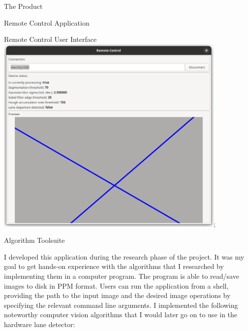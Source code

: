 \documentclass{matthijs}
\begin{document}
\begin{hoofdstuk}{The Product}
\begin{paragraaf}{Remote Control Application}
			\vspace{1.5ex}
			\begin{figuur}{Remote Control User Interface}
				\includegraphics[width=0.845\textwidth]{product-gui.png};
			\end{figuur}
			\vspace{-1ex}

		\end{paragraaf}

		\begin{paragraaf}{Algorithm Toolsuite}

			I developed this application during the research phase of the project.
			It was my goal to get hands-on experience with the algorithms that I researched by implementing them in a computer program.
			The program is able to read/save images to disk in PPM format.
			Users can run the application from a shell, providing the path to the input image and the desired image operations by specifying the relevant command line arguments.
			I implemented the following noteworthy computer vision algorithms that I would later go on to use in the hardware lane detector:


\end{paragraaf}
\end{hoofdstuk}
\end{document}
